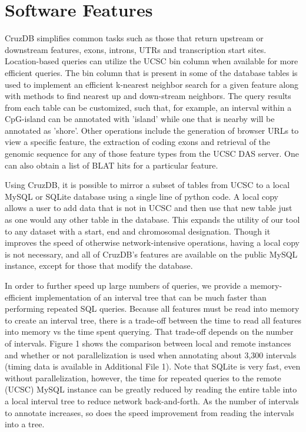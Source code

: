 \documentclass[10pt]{bmc_article}
\newenvironment{bmcformat}{\baselineskip20pt\sloppy\setboolean{publ}{false}}{\baselineskip20pt\sloppy}
\begin{document}
\begin{bmcformat}
\section*{Software Features}
CruzDB simplifies common tasks such as those that return upstream or downstream features, exons, introns, UTRs and transcription start sites. Location-based queries can utilize the UCSC bin column \cite{KentBrowser} when available for more efficient queries. The bin column that is present in some of the database tables is used to implement an efficient k-nearest neighbor search for a given feature along with methods to find nearest up and down-stream neighbors. The query results from each table can be customized, such that, for example, an interval within a CpG-island can be annotated with 'island' while one that is nearby will be annotated as 'shore'. Other operations include the generation of browser URLs to view a specific feature, the extraction of coding exons and retrieval of the genomic sequence for any of those feature types from the UCSC DAS server. One can also obtain a list of BLAT \cite{KentBLAT} hits for a particular feature.

Using CruzDB, it is possible to mirror a subset of tables from UCSC to a local MySQL or SQLite database using a single line of python code. A local copy allows a user to add data that is not in UCSC and then use that new table just as one would any other table in the database. This expands the utility of our tool to any dataset with a start, end and chromosomal designation. Though it improves the speed of otherwise network-intensive operations, having a local copy is not necessary, and all of CruzDB's features are available on the public MySQL instance, except for those that modify the database.

In order to further speed up large numbers of queries, we provide a memory-efficient implementation of an interval tree that can be much faster than performing repeated SQL queries. Because all features must be read into memory to create an interval tree, there is a trade-off between the time to read all features into memory vs the time spent querying. That trade-off depends on the number of intervals. Figure 1 shows the comparison between local and remote instances and whether or not parallelization is used when annotating about 3,300 intervals (timing data is available in Additional File 1). Note that SQLite is very fast, even without parallelization, however, the time for repeated queries to the remote (UCSC) MySQL instance can be greatly reduced by reading the entire table into a local interval tree to reduce network back-and-forth. As the number of intervals to annotate increases, so does the speed improvement from reading the intervals into a tree.


\end{bmcformat}
\end{document}
